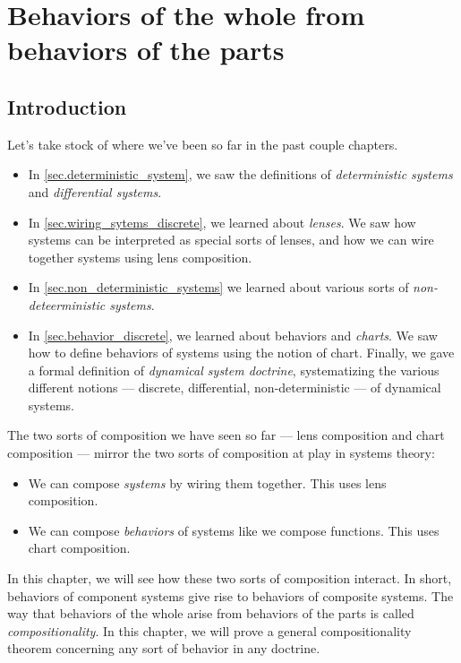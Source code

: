 \documentclass[DynamicalBook]{subfiles}
\begin{document}
%


\setcounter{chapter}{4}%


\chapter{Behaviors of the whole from behaviors of the parts}\label{chapter.5}

\section{Introduction}

Let's take stock of where we've been so far in the past couple chapters.
\begin{itemize}
  \item In \cref{sec.deterministic_system}, we saw the definitions of
    \emph{deterministic systems} and \emph{differential systems}.
  \item In \cref{sec.wiring_sytems_discrete}, we learned about \emph{lenses}. We saw how systems can be
    interpreted as special sorts of lenses, and how we can wire together systems
    using lens composition.
  \item In \cref{sec.non_deterministic_systems} we learned about various sorts
    of \emph{non-deteerministic systems}.
  \item In \cref{sec.behavior_discrete}, we learned about behaviors and \emph{charts}. We saw
    how to define behaviors of systems using the notion of chart. Finally, we
    gave a formal definition of \emph{dynamical system doctrine}, systematizing
    the various different notions --- discrete, differential, non-deterministic
    --- of dynamical systems. 
\end{itemize}

The two sorts of composition we have seen so far --- lens composition and chart
composition --- mirror the two sorts of composition at play in systems theory:
\begin{itemize}
  \item We can compose \emph{systems} by wiring them together. This uses lens composition.
  \item We can compose \emph{behaviors} of systems like we compose functions.
    This uses chart composition.
\end{itemize}

In this chapter, we will see how these two sorts of composition interact. In
short, behaviors of component systems give rise to behaviors of composite
systems. The way that behaviors of the whole arise from behaviors of the parts
is called \emph{compositionality}. In this chapter, we will prove a general
compositionality theorem concerning any sort of behavior in any doctrine.
\end{document}
